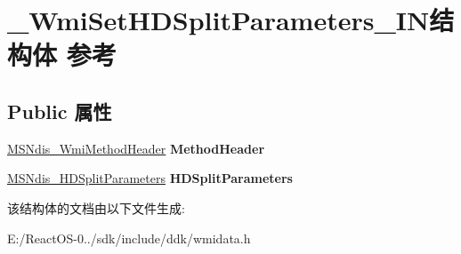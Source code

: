 \hypertarget{struct___wmi_set_h_d_split_parameters___i_n}{}\section{\+\_\+\+Wmi\+Set\+H\+D\+Split\+Parameters\+\_\+\+I\+N结构体 参考}
\label{struct___wmi_set_h_d_split_parameters___i_n}
\subsection*{Public 属性}
\begin{DoxyCompactItemize}
\item 
\mbox{\label{struct___wmi_set_h_d_split_parameters___i_n_a5ae735770dd8f8f49d019546560f817a}} 
\hyperlink{struct___m_s_ndis___wmi_method_header}{M\+S\+Ndis\+\_\+\+Wmi\+Method\+Header} {\bfseries Method\+Header}
\item 
\mbox{\label{struct___wmi_set_h_d_split_parameters___i_n_ad59c990bef82de7bc28d180ca69eb45e}} 
\hyperlink{struct___m_s_ndis___h_d_split_parameters}{M\+S\+Ndis\+\_\+\+H\+D\+Split\+Parameters} {\bfseries H\+D\+Split\+Parameters}
\end{DoxyCompactItemize}


该结构体的文档由以下文件生成\+:\begin{DoxyCompactItemize}
\item 
E\+:/\+React\+O\+S-\/0../sdk/include/ddk/wmidata.\+h\end{DoxyCompactItemize}
